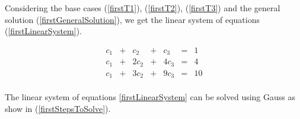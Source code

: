 \documentclass[12pt]{scrartcl}
\begin{document}
\begin{enumerate}
\begin{enumerate}
			Considering the base cases (\ref{firstT1}), (\ref{firstT2}), (\ref{firstT3}) and the general solution (\ref{firstGeneralSolution}), we get the linear system of equations (\ref{firstLinearSystem}).
			
			\begin{equation}\label{firstLinearSystem}
				\begin{array}{ccccccc}
					c_1	&	+	&	c_2	&	+	&	c_3	&	=	&	1 \\
					c_1	&	+	&	2c_2	&	+	&	4c_3	&	=	&	4 \\
					c_1	&	+	&	3c_2	&	+	&	9c_3	&	=	&	10 \\
				\end{array}
			\end{equation}
			
			The linear system of equations \ref{firstLinearSystem} can be solved using Gauss as show in (\ref{firstStepsToSolve}).
			

\end{enumerate}
\end{enumerate}
\end{document}
